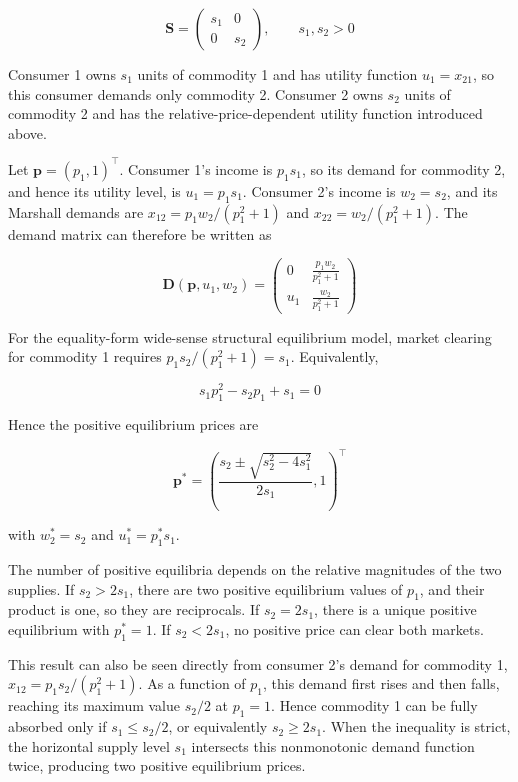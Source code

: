 \documentclass[
  letterpaper,
  DIV=11,
  numbers=noendperiod]{scrreprt}
\begin{document}
\[
\mathbf S=
\begin{pmatrix}
s_1&0\\
0&s_2
\end{pmatrix},
\qquad s_1,s_2>0
\]

Consumer 1 owns \(s_1\) units of commodity 1 and has utility function
\(u_1=x_{21}\), so this consumer demands only commodity 2. Consumer 2
owns \(s_2\) units of commodity 2 and has the relative-price-dependent
utility function introduced above.

Let \(\mathbf p=(p_1,1)^\top\). Consumer 1's income is \(p_1s_1\), so
its demand for commodity 2, and hence its utility level, is
\(u_1=p_1s_1\). Consumer 2's income is \(w_2=s_2\), and its Marshall
demands are \(x_{12}=p_1w_2/(p_1^2+1)\) and \(x_{22}=w_2/(p_1^2+1)\).
The demand matrix can therefore be written as

\[
\mathbf D(\mathbf p,u_1,w_2)=
\begin{pmatrix}
0&\frac{p_1w_2}{p_1^2+1}\\
u_1&\frac{w_2}{p_1^2+1}
\end{pmatrix}
\]

For the equality-form wide-sense structural equilibrium model, market
clearing for commodity 1 requires \(p_1s_2/(p_1^2+1)=s_1\).
Equivalently,

\[
s_1p_1^2-s_2p_1+s_1=0
\]

Hence the positive equilibrium prices are

\[
\mathbf p^*
=
\left(
\frac{s_2\pm\sqrt{s_2^2-4s_1^2}}{2s_1},
1
\right)^\top
\]

with \(w_2^*=s_2\) and \(u_1^*=p_1^*s_1\).

The number of positive equilibria depends on the relative magnitudes of
the two supplies. If \(s_2>2s_1\), there are two positive equilibrium
values of \(p_1\), and their product is one, so they are reciprocals. If
\(s_2=2s_1\), there is a unique positive equilibrium with \(p_1^*=1\).
If \(s_2<2s_1\), no positive price can clear both markets.

This result can also be seen directly from consumer 2's demand for
commodity 1, \(x_{12}=p_1s_2/(p_1^2+1)\). As a function of \(p_1\), this
demand first rises and then falls, reaching its maximum value \(s_2/2\)
at \(p_1=1\). Hence commodity 1 can be fully absorbed only if
\(s_1\leq s_2/2\), or equivalently \(s_2\geq2s_1\). When the inequality
is strict, the horizontal supply level \(s_1\) intersects this
nonmonotonic demand function twice, producing two positive equilibrium
prices.
\end{document}
